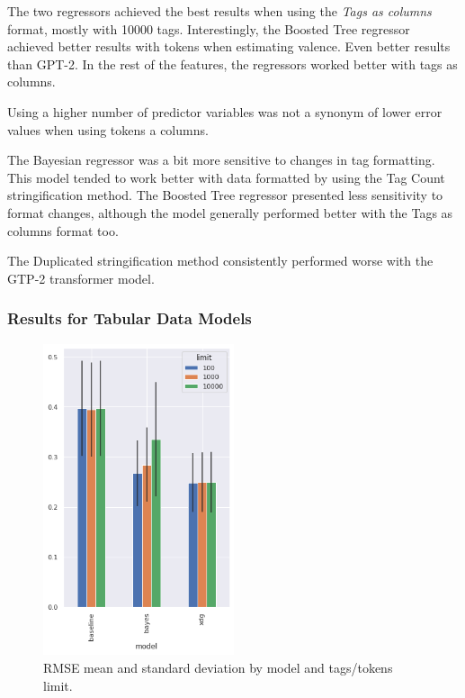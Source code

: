 \documentclass[sn-mathphys]{sn-jnl}%
\theoremstyle{thmstyleone}%
\theoremstyle{thmstyletwo}%
\theoremstyle{thmstylethree}%
\begin{document}
The two regressors achieved the best results when using the \emph{Tags as columns} format, mostly with \num{10000} tags.
Interestingly, the Boosted Tree regressor achieved better results with tokens when estimating valence.
Even better results than GPT-2.
In the rest of the features, the regressors worked better with tags as columns.

Using a higher number of predictor variables was not a synonym of lower error values when using tokens a columns.

The Bayesian regressor was a bit more sensitive to changes in tag formatting.
This model tended to work better with data formatted by using the Tag Count stringification method.
The Boosted Tree regressor presented less sensitivity to format changes, although the model generally performed better with the Tags as columns format too.

The Duplicated stringification method consistently performed worse with the GTP-2 transformer model.



\subsubsection{Results for Tabular Data Models}

\begin{figure}[h!]
      \centering
      \includegraphics[width=0.5\textwidth]{images/rmse_by_model_and_limit.png}
      \caption{RMSE mean and standard deviation by model and tags/tokens limit.}
      \label{fig:rmse_by_model_and_limit}
\end{figure}
\end{document}
